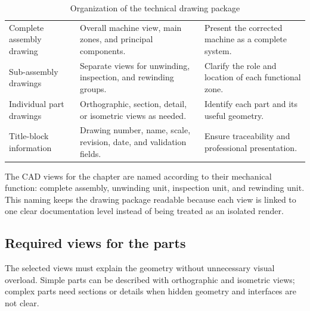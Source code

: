 \begin{table}[H]
\centering
\small
\caption{Organization of the technical drawing package}
\label{tab:chapter2-6}
\begin{tabularx}{\textwidth}{|P{0.25\textwidth}|P{0.34\textwidth}|Y|}
\hline
{}
 &  &  \\
\hline
Complete assembly drawing & Overall machine view, main zones, and principal components. & Present the corrected machine as a complete system. \\
\hline
Sub-assembly drawings & Separate views for unwinding, inspection, and rewinding groups. & Clarify the role and location of each functional zone. \\
\hline
Individual part drawings & Orthographic, section, detail, or isometric views as needed. & Identify each part and its useful geometry. \\
\hline
Title-block information & Drawing number, name, scale, revision, date, and validation fields. & Ensure traceability and professional presentation. \\
\hline
\end{tabularx}
\end{table}

The CAD views for the chapter are named according to their mechanical function: complete assembly, unwinding unit, inspection unit, and rewinding unit. This naming keeps the drawing package readable because each view is linked to one clear documentation level instead of being treated as an isolated render.

\subsection{Required views for the parts}

The selected views must explain the geometry without unnecessary visual overload. Simple parts can be described with orthographic and isometric views; complex parts need sections or details when hidden geometry and interfaces are not clear.

